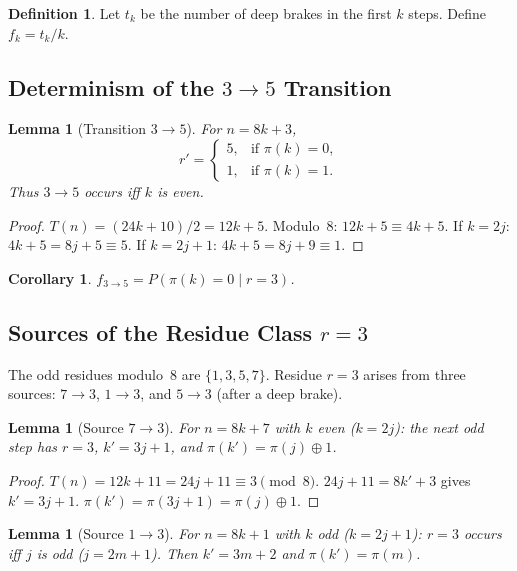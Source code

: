 \documentclass[12pt,a4paper]{article}
\newtheorem{lemma}[theorem]{Lemma}
\newtheorem{corollary}[theorem]{Corollary}
\theoremstyle{definition}
\newtheorem{definition}[theorem]{Definition}
\theoremstyle{remark}
\begin{document}
\begin{definition}\label{def:fk}
Let $t_k$ be the number of deep brakes in the first $k$ steps.
Define $f_k=t_k/k$.
\end{definition}

\subsection{Determinism of the $3\to5$ Transition}

\begin{lemma}[Transition $3\to5$]\label{lem:35trans}
For $n=8k+3$,
\[
r'=\begin{cases}
5, &\text{if }\pi(k)=0,\\
1, &\text{if }\pi(k)=1.
\end{cases}
\]
Thus $3\to5$ occurs iff $k$ is even.
\end{lemma}

\begin{proof}
$T(n)=(24k+10)/2=12k+5$.
Modulo~$8$: $12k+5\equiv4k+5$.
If $k=2j$: $4k+5=8j+5\equiv5$.
If $k=2j+1$: $4k+5=8j+9\equiv1$.
\end{proof}

\begin{corollary}\label{cor:f35prob}
$f_{3\to5}=P(\pi(k)=0\mid r=3)$.
\end{corollary}

\subsection{Sources of the Residue Class $r=3$}

The odd residues modulo~$8$ are $\{1,3,5,7\}$.
Residue $r=3$ arises from three sources:
$7\to3$, $1\to3$, and $5\to3$ (after a deep brake).

\begin{lemma}[Source $7\to3$]\label{lem:source73}
For $n=8k+7$ with $k$ even ($k=2j$): the next odd step has $r=3$,
$k'=3j+1$, and $\pi(k')=\pi(j)\oplus1$.
\end{lemma}

\begin{proof}
$T(n)=12k+11=24j+11\equiv3\pmod8$.
$24j+11=8k'+3$ gives $k'=3j+1$.
$\pi(k')=\pi(3j+1)=\pi(j)\oplus1$.
\end{proof}

\begin{lemma}[Source $1\to3$]\label{lem:source13}
For $n=8k+1$ with $k$ odd ($k=2j+1$):
$r=3$ occurs iff $j$ is odd ($j=2m+1$).
Then $k'=3m+2$ and $\pi(k')=\pi(m)$.
\end{lemma}
\end{document}
